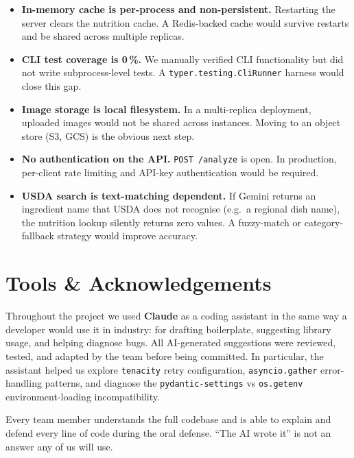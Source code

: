 \documentclass[11pt,a4paper]{article}
\begin{document}
\begin{itemize}[topsep=4pt,itemsep=4pt]
  \item \textbf{In-memory cache is per-process and non-persistent.}
    Restarting the server clears the nutrition cache.
    A Redis-backed cache would survive restarts and be shared across multiple replicas.

  \item \textbf{CLI test coverage is 0\,\%.}
    We manually verified CLI functionality but did not write subprocess-level tests.
    A \texttt{typer.testing.CliRunner} harness would close this gap.

  \item \textbf{Image storage is local filesystem.}
    In a multi-replica deployment, uploaded images would not be shared across instances.
    Moving to an object store (S3, GCS) is the obvious next step.

  \item \textbf{No authentication on the API.}
    \texttt{POST /analyze} is open.
    In production, per-client rate limiting and API-key authentication would be required.

  \item \textbf{USDA search is text-matching dependent.}
    If Gemini returns an ingredient name that USDA does not recognise (e.g.\ a regional dish name),
    the nutrition lookup silently returns zero values.
    A fuzzy-match or category-fallback strategy would improve accuracy.
\end{itemize}

\section{Tools \& Acknowledgements}\label{sec:tools}

Throughout the project we used \textbf{Claude}  as a coding assistant in the same way a developer would use it in industry: for drafting boilerplate, suggesting library usage, and helping diagnose bugs.
All AI-generated suggestions were reviewed, tested, and adapted by the team before being committed.
In particular, the assistant helped us explore \texttt{tenacity} retry configuration, \texttt{asyncio.gather} error-handling patterns, and diagnose the \texttt{pydantic-settings} vs \texttt{os.getenv} environment-loading incompatibility.

Every team member understands the full codebase and is able to explain and defend every line of code during the oral defense.
``The AI wrote it'' is not an answer any of us will use.
\end{document}
